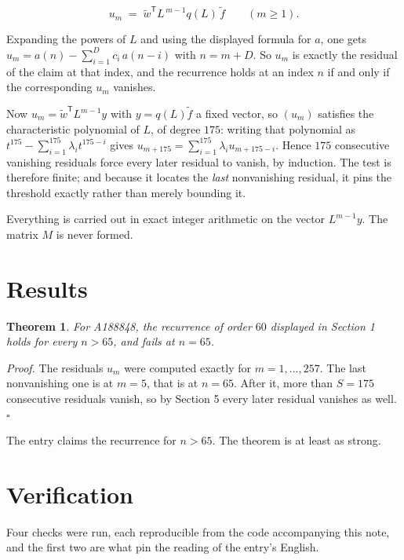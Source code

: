 \documentclass[11pt]{article}
\newtheorem{theorem}{Theorem}
\theoremstyle{definition}
\begin{document}
\[u_m \;=\; \tilde w^{\mathsf T} L^{\,m-1} q(L)\,\tilde f \qquad (m \ge 1).\]

Expanding the powers of $L$ and using the displayed formula for $a$, one gets $u_m = a(n) - \sum_{i=1}^{D} c_i\,a(n-i)$ with $n = m + D$. So $u_m$ is exactly the residual of the claim at that index, and the recurrence holds at an index $n$ if and only if the corresponding $u_m$ vanishes.

Now $u_m = \tilde w^{\mathsf T} L^{m-1} y$ with $y = q(L)\tilde f$ a fixed vector, so $(u_m)$ satisfies the characteristic polynomial of $L$, of degree $175$: writing that polynomial as $t^{175} - \sum_{i=1}^{175} \lambda_i t^{175-i}$ gives $u_{m+175} = \sum_{i=1}^{175} \lambda_i u_{m+175-i}$. Hence $175$ consecutive vanishing residuals force every later residual to vanish, by induction. The test is therefore finite; and because it locates the {\itshape last} nonvanishing residual, it pins the threshold exactly rather than merely bounding it.

Everything is carried out in exact integer arithmetic on the vector $L^{m-1}y$. The matrix $M$ is never formed.

\section{Results}

\begin{theorem} For A188848, the recurrence of order $60$ displayed in Section 1 holds for every $n > 65$, and fails at $n = 65$.\end{theorem}

{\itshape Proof.} The residuals $u_m$ were computed exactly for $m = 1,\dots,257$. The last nonvanishing one is at $m = 5$, that is at $n = 65$. After it, more than $S = 175$ consecutive residuals vanish, so by Section 5 every later residual vanishes as well. $\square$

The entry claims the recurrence for $n > 65$. The theorem is at least as strong.

\section{Verification}

Four checks were run, each reproducible from the code accompanying this note, and the first two are what pin the reading of the entry's English.
\end{document}
